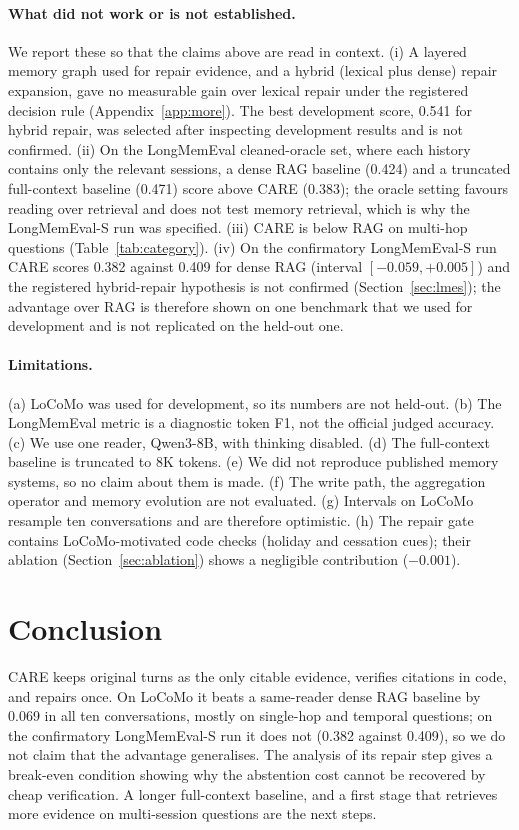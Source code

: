 \documentclass[10pt]{article}
\theoremstyle{plain}
\newcommand{\care}{\textsc{CARE}}
\begin{document}
\paragraph{What did not work or is not established.} We report these so that the claims above are read in context.
(i) A layered memory graph used for repair evidence, and a hybrid (lexical plus dense) repair expansion, gave no
measurable gain over lexical repair under the registered decision rule (Appendix~\ref{app:more}). The best development
score, 0.541 for hybrid repair, was selected after inspecting development results and is not confirmed. (ii) On the
LongMemEval cleaned-oracle set, where each history contains only the relevant sessions, a dense RAG baseline (0.424) and a
truncated full-context baseline (0.471) score above \care{} (0.383); the oracle setting favours reading over retrieval and
does not test memory retrieval, which is why the LongMemEval-S run was specified. (iii) \care{} is below RAG on multi-hop
questions (Table~\ref{tab:category}). (iv) On the confirmatory LongMemEval-S run \care{} scores 0.382 against 0.409 for
dense RAG (interval $[-0.059,+0.005]$) and the registered hybrid-repair hypothesis is not confirmed
(Section~\ref{sec:lmes}); the advantage over RAG is therefore shown on one benchmark that we used for development and
is not replicated on the held-out one.

\paragraph{Limitations.} (a) LoCoMo was used for development, so its numbers are not held-out. (b) The LongMemEval metric
is a diagnostic token F1, not the official judged accuracy. (c) We use one reader, Qwen3-8B, with thinking disabled.
(d) The full-context baseline is truncated to 8K tokens. (e) We did not reproduce published memory systems, so no claim
about them is made. (f) The write path, the aggregation operator and memory evolution are not evaluated. (g) Intervals on
LoCoMo resample ten conversations and are therefore optimistic. (h) The repair gate contains LoCoMo-motivated code checks
(holiday and cessation cues); their ablation (Section~\ref{sec:ablation}) shows a negligible contribution ($-0.001$).

\section{Conclusion}

\care{} keeps original turns as the only citable evidence, verifies citations in code, and repairs once. On LoCoMo it
beats a same-reader dense RAG baseline by 0.069 in all ten conversations, mostly on single-hop and temporal questions; on
the confirmatory LongMemEval-S run it does not (0.382 against 0.409), so we do not claim that the advantage generalises.
The analysis of its repair step gives a break-even condition showing why the abstention cost cannot be recovered by cheap
verification. A longer full-context baseline, and a first stage that retrieves more evidence
on multi-session questions are the next steps.
\end{document}
